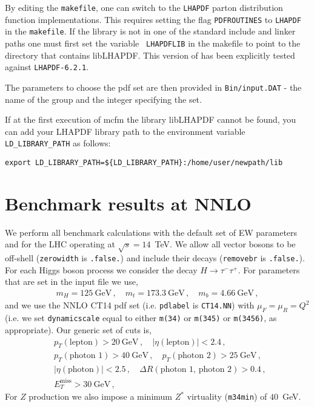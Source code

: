 \documentclass{article}
\begin{document}
By editing the {\tt makefile}, one can switch to the {\tt LHAPDF} parton distribution function 
implementations. This requires setting the flag {\tt PDFROUTINES} to {\tt LHAPDF} in the {\tt makefile}.
If the library is not in one of the standard include and linker paths one must first set the variable {\tt 
LHAPDFLIB} in the makefile to point to the directory that contains libLHAPDF. This version of \MCFM has been 
explicitly tested against {\tt LHAPDF-6.2.1}. 

The parameters to choose the pdf set are then provided in {\tt Bin/input.DAT} - 
the name of the group and the integer specifying the set.

If at the first execution of mcfm the library libLHAPDF cannot be found, you can add your LHAPDF library 
path to the environment variable {\tt LD\_LIBRARY\_PATH} as follows:
\begin{verbatim}
export LD_LIBRARY_PATH=${LD_LIBRARY_PATH}:/home/user/newpath/lib
\end{verbatim}

\section{Benchmark results at NNLO }
\label{sec:NNLO}
We perform all benchmark calculations with the default set of EW parameters
and for the LHC operating at $\sqrt s = 14$~TeV.  We allow all
vector bosons to be off-shell ({\tt zerowidth} is {\tt .false.})
and include their decays ({\tt removebr} is {\tt .false.}).
For each Higgs boson process we consider the decay $H \to \tau^- \tau^+$.
For parameters that are set in the input file we use,
\begin{eqnarray}
m_H = 125~\mbox{GeV} \,, \quad
m_t = 173.3~\mbox{GeV} \,, \quad 
m_b = 4.66~\mbox{GeV} \,, 
\end{eqnarray}
and we use the NNLO CT14 pdf set (i.e. {\tt pdlabel} is {\tt CT14.NN}) with
$\mu_F = \mu_R = Q^2$ (i.e. we set {\tt dynamicscale} equal to
either {\tt m(34)} or {\tt m(345)} or {\tt m(3456)}, as appropriate).
Our generic set of cuts is,
\begin{eqnarray}
&& p_T(\mbox{lepton}) > 20~\mbox{GeV} \,, \quad
|\eta(\mbox{lepton})| < 2.4 \,, \quad \nonumber \\
&& p_T(\mbox{photon 1}) > 40~\mbox{GeV} \,, \quad
   p_T(\mbox{photon 2}) > 25~\mbox{GeV} \,, \quad \nonumber \\
&&|\eta(\mbox{photon})| < 2.5 \,, \quad 
\Delta R(\mbox{photon 1, photon 2}) > 0.4 \,, \quad \nonumber \\
&& E_T^{\mbox{miss}} > 30~\mbox{GeV} \,, \quad
\end{eqnarray}
For $Z$ production we also impose a minimum $Z^*$ virtuality ({\tt m34min})
of $40$~GeV.
\end{document}

